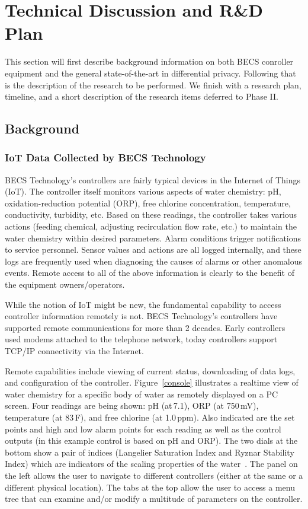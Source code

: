 \section{Technical Discussion and R\&D Plan}
\label{sec:research}

This section will first describe background information on both BECS
conroller equipment and the general state-of-the-art in differential
privacy.  Following that is the description of the research to be
performed.  We finish with a research plan, timeline, and a short
description of the research items deferred to Phase II.

\subsection{Background}
\label{sec:background}

\subsubsection{IoT Data Collected by BECS Technology}

BECS Technology's controllers are fairly typical devices
in the Internet of Things (IoT).
The controller itself monitors various aspects of water chemistry:
pH, oxidation-reduction potential (ORP), free chlorine concentration,
temperature, conductivity, turbidity, etc. 
Based on these readings, the controller takes various actions
(feeding chemical, adjusting recirculation flow rate, etc.) to maintain
the water chemistry within desired parameters.
Alarm conditions trigger notifications to service personnel.
Sensor values and actions are all logged internally,
and these logs are frequently used when diagnosing the causes
of alarms or other anomalous events.
Remote access to all of the above information is
clearly to the benefit of the equipment owners/operators.

While the notion of IoT might be new,
the fundamental capability to access controller information remotely
is not.  BECS Technology's controllers have supported remote communications
for more than 2 decades.
Early controllers used modems attached to the telephone network, today
controllers support TCP/IP connectivity via the Internet.

Remote capabilities include viewing of current status, downloading
of data logs, and configuration of the controller.
Figure~\ref{console} illustrates a realtime view of water chemistry
for a specific body of water
as remotely displayed on a PC screen.  Four readings are being shown:
pH (at\,7.1), ORP (at 750\,mV), temperature (at 83\,\degree F), and
free chlorine (at 1.0\,ppm).  Also indicated are the set points and
high and low alarm points for each reading as well as the control
outputs (in this example control is based on pH and ORP).
The two dials at the bottom show a pair of indices
(Langelier Saturation Index and Ryznar Stability Index)
which are indicators of the scaling properties of the water~\cite{mb88}.
The panel on the left allows the user to navigate to different
controllers (either at the same or a different physical location).
The tabs at the top allow the user to access a menu tree that
can examine and/or modify a multitude of parameters on the controller.

